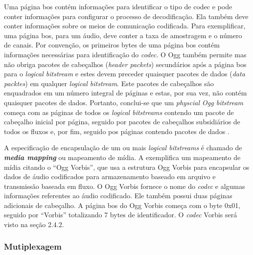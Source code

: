Uma página bos contém informações para identificar o tipo de codec e pode conter informações para configurar o processo de decodificação. Ela também deve conter informações sobre os meios de comunicação codificada. Para exemplificar, uma página bos, para um áudio, deve conter a taxa de amostragem e o número de canais. Por convenção, os primeiros bytes de uma página bos contém informações necessárias para identificação do \textit{codec}. O Ogg também permite mas não obriga pacotes de cabeçalhos (\textit{header packets}) secundários após a página bos para o \textit{logical bitstream} e estes devem preceder quaisquer pacotes de dados (\textit{data packtes}) em qualquer \textit{logical bitstream}. Este pacotes de cabeçalhos são enquadrados em um número integral de páginas e estas, por sua vez, não contém quaisquer pacotes de dados. Portanto, conclui-se que um \textit{physcial Ogg bitstream} começa com as páginas de todos os \textit{logical bitstreams} contendo um pacote de cabeçalho inicial por página, seguido por pacotes de cabeçalhos subsidiários  de todos os fluxos e, por fim, seguido pos páginas contendo pacotes de dados \cite{ogg}.

 A especificação de encapsulação de um ou mais \textit{logical bitstreams} é chamado de  \textbf{\textit{media mapping}}  ou mapeamento de mídia. A \cite{ogg} exemplifica um mapeamento de mídia citando o ``Ogg Vorbis'', que usa a estrutura Ogg Vorbis para encapsular os dados de áudio codificados para armazenamento baseado em arquivo e transmissão baseada em fluxo. O Ogg Vorbis fornece o nome do \textit{codec} e algumas informações referentes ao áudio codificado. Ele também possui duas páginas adicionais de cabeçalho. A página bos do Ogg Vorbis começa com o byte 0x01, seguido por ``Vorbis'' totalizando 7 bytes de identificador. O \textit{codec} Vorbis será visto na seção 2.4.2.

\subsubsection{Mutiplexagem}

